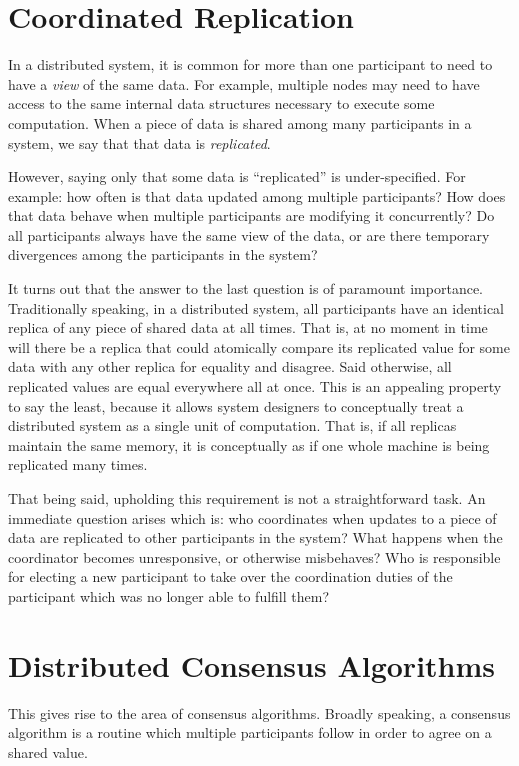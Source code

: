 \section{Coordinated Replication}
In a distributed system, it is common for more than one participant to need to
have a \textit{view} of the same data. For example, multiple nodes may need to
have access to the same internal data structures necessary to execute some
computation. When a piece of data is shared among many participants in a system,
we say that that data is \textit{replicated}.

However, saying only that some data is ``replicated'' is under-specified. For
example: how often is that data updated among multiple participants? How does
that data behave when multiple participants are modifying it concurrently? Do
all participants always have the same view of the data, or are there temporary
divergences among the participants in the system?

It turns out that the answer to the last question is of paramount importance.
Traditionally speaking, in a distributed system, all participants have an
identical replica of any piece of shared data at all times. That is, at no
moment in time will there be a replica that could atomically compare its
replicated value for some data with any other replica for equality and disagree.
Said otherwise, all replicated values are equal everywhere all at once. This is
an appealing property to say the least, because it allows system designers to
conceptually treat a distributed system as a single unit of computation. That
is, if all replicas maintain the same memory, it is conceptually as if one whole
machine is being replicated many times.

That being said, upholding this requirement is not a straightforward task. An
immediate question arises which is: who coordinates when updates to a piece of
data are replicated to other participants in the system? What happens when the
coordinator becomes unresponsive, or otherwise misbehaves? Who is responsible
for electing a new participant to take over the coordination duties of the
participant which was no longer able to fulfill them?

\section{Distributed Consensus Algorithms}
\label{sec:dca-safety}

This gives rise to the area of consensus algorithms. Broadly speaking, a
consensus algorithm is a routine which multiple participants follow in order to
agree on a shared value.

